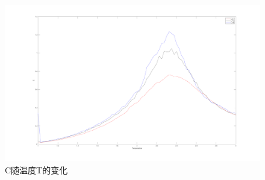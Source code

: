 \documentclass[UTF8,a4paper,10pt]{ctexart}
\begin{document}
\begin{figure}[!htbp]
    \centering
    \includegraphics[width=1\textwidth,height=1\textwidth]{pictures/c.png}
    \caption{C随温度T的变化} \label{c}
\end{figure}




\end{document}
